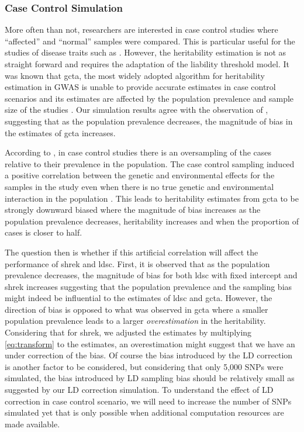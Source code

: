 	\subsubsection{Case Control Simulation}
	More often than not, researchers are interested in case control studies where ``affected'' and ``normal'' samples were compared. 
	This is particular useful for the studies of disease traits such as .
	However, the heritability estimation is not as straight forward and requires the adaptation of the liability threshold model.
	It was known that \gls{gcta}, the most widely adopted algorithm for heritability estimation in \gls{GWAS} is unable to provide accurate estimates in case control scenarios and its estimates are affected by the population prevalence and sample size of the studies \citep{Golan2014}.
	Our simulation results agree with the observation of \citet{Golan2014}, suggesting that as the population prevalence decreases, the magnitude of bias in the estimates of \gls{gcta} increases.
	
	According to \citet{Golan2014}, in case control studies there is an oversampling of the cases relative to their prevalence in the population.
	The case control sampling induced a positive correlation between the genetic and environmental effects for the samples in the study even when there is no true genetic and environmental interaction in the population \citep{Golan2014}.
	This leads to heritability estimates from \gls{gcta} to be strongly downward biased where the magnitude of bias increases as the population prevalence decreases, heritability increases and when the proportion of cases is closer to half.

	The question then is whether if this artificial correlation will affect the performance of \gls{shrek} and \gls{ldsc}.
	First, it is observed that as the population prevalence decreases, the magnitude of bias for both \gls{ldsc} with fixed intercept and \gls{shrek} increases suggesting that the population prevalence and the sampling bias might indeed be influential to the estimates of \gls{ldsc} and \gls{gcta}.
	However, the direction of bias is opposed to what was observed in \gls{gcta} where a smaller population prevalence leads to a larger \emph{overestimation} in the heritability.
	Considering that for \gls{shrek}, we adjusted the estimates by multiplying \cref{eq:transform} to the estimates, an overestimation might suggest that we have an under correction of the bias. 
	Of course the bias introduced by the \gls{LD} correction is another factor to be considered, but considering that only 5,000 \glspl{SNP} were simulated, the bias introduced by \gls{LD} sampling bias should be relatively small as suggested by our \gls{LD} correction simulation.
	To understand the effect of \gls{LD} correction in case control scenario, we will need to increase the number of \glspl{SNP} simulated yet that is only possible when additional computation resources are made available.
	
